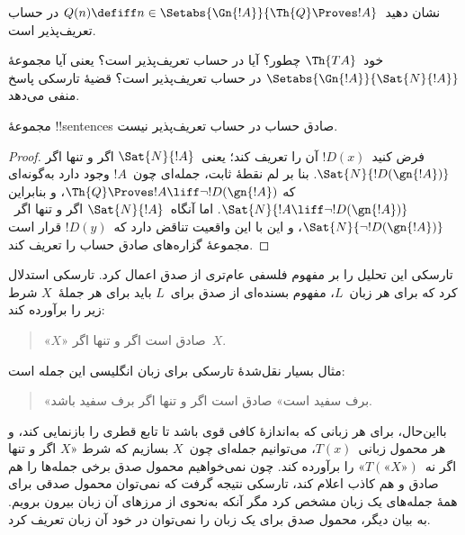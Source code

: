 \documentclass[../../../include/open-logic-section]{subfiles}
\begin{document}
\begin{prob}
نشان دهید~$Q(n) \defiff n \in \Setabs{\Gn{!A}}{\Th{Q} \Proves !A}$
  در حساب تعریف‌پذیر است.
\end{prob}

خود~$\Th{TA}$ چطور؟ آیا در حساب تعریف‌پذیر است؟ یعنی آیا مجموعهٔ
$\Setabs{\Gn{!A}}{\Sat{N}{!A}}$ در حساب تعریف‌پذیر است؟ قضیهٔ تارسکی
پاسخ منفی می‌دهد.

\begin{thm}
مجموعهٔ !!{sentence}s صادق حساب در حساب تعریف‌پذیر نیست.
\end{thm}

\begin{proof}
فرض کنید~$!D(x)$ آن را تعریف کند؛ یعنی~$\Sat{N}{!A}$ اگر و تنها اگر
$\Sat{N}{!D(\gn{!A})}$. بنا بر لم نقطهٔ ثابت، جمله‌ای چون~$!A$
وجود دارد به‌گونه‌ای که
$\Th{Q} \Proves !A \liff \lnot !D(\gn{!A})$، و بنابراین
$\Sat{N}{!A \liff \lnot !D(\gn{!A})}$. اما آنگاه~$\Sat{N}{!A}$ اگر و
تنها اگر~$\Sat{N}{\lnot !D(\gn{!A})}$، و این با این واقعیت تناقض دارد
که~$!D(y)$ قرار است مجموعهٔ گزاره‌های صادق حساب را تعریف کند.
\end{proof}

تارسکی این تحلیل را بر مفهوم فلسفی عام‌تری از صدق اعمال کرد. تارسکی
استدلال کرد که برای هر زبان~$L$، مفهوم بسنده‌ای از صدق برای~$L$ باید
برای هر جملهٔ~$X$ شرط زیر را برآورده کند:
\begin{quote}
«$X$» صادق است اگر و تنها اگر~$X$.
\end{quote}
مثال بسیار نقل‌شدهٔ تارسکی برای زبان انگلیسی این جمله است:
\begin{quote}
«برف سفید است» صادق است اگر و تنها اگر برف سفید باشد.
\end{quote}
بااین‌حال، برای هر زبانی که به‌اندازهٔ کافی قوی باشد تا تابع قطری را
بازنمایی کند، و هر محمول زبانی~$T(x)$، می‌توانیم جمله‌ای چون~$X$ بسازیم
که شرط «$X$ اگر و تنها اگر نه~$T(\text{«$X$»})$» را برآورده کند. چون
نمی‌خواهیم محمول صدق برخی جمله‌ها را هم صادق و هم کاذب اعلام کند، تارسکی
نتیجه گرفت که نمی‌توان محمول صدقی برای همهٔ جمله‌های یک زبان مشخص کرد
مگر آنکه به‌نحوی از مرزهای آن زبان بیرون برویم. به بیان دیگر، محمول صدق
برای یک زبان را نمی‌توان در خود آن زبان تعریف کرد.
\end{document}
